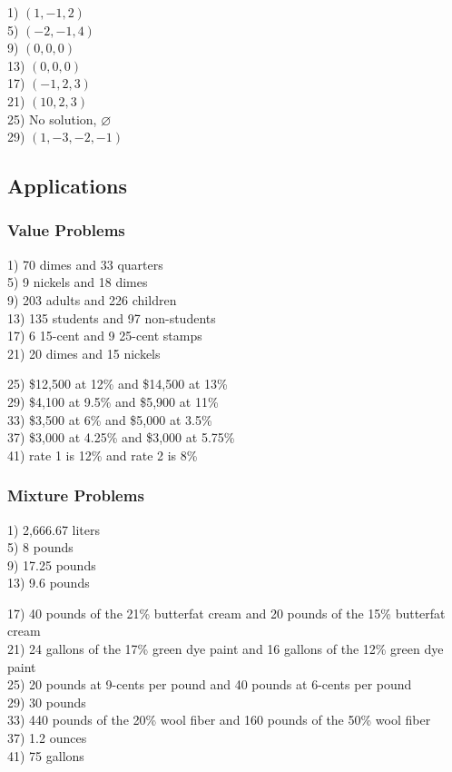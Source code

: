 \documentclass[11pt]{book}
\begin{document}
\begin{multicols}{2}
1) $(1,-1,2)$\\
5) $(-2,-1,4)$\\
9) $(0,0,0)$\\
13) $(0,0,0)$\\
17) $(-1,2,3)$\\
21) $(10,2,3)$\\
25) No solution, $\varnothing$\\
29) $(1,-3,-2,-1)$
\end{multicols}

\subsection*{Applications}
\subsubsection{Value Problems}

\begin{multicols}{2}
1) 70 dimes and 33 quarters\\
5) 9 nickels and 18 dimes\\
9) 203 adults and 226 children\\
13) 135 students and 97 non-students\\
17) 6 15-cent and 9 25-cent stamps\\
21) 20 dimes and 15 nickels
\end{multicols}
25) \$12,500 at 12\% and \$14,500 at 13\% \\
29) \$4,100 at 9.5\% and \$5,900 at 11\% \\
33) \$3,500 at 6\% and \$5,000 at 3.5\% \\
37) \$3,000 at 4.25\% and \$3,000 at 5.75\% \\
41) rate 1 is 12\% and rate 2 is 8\%

\subsubsection{Mixture Problems}

\begin{multicols}{2}
1) 2,666.67 liters\\
5) 8 pounds\\
9) 17.25 pounds\\
13) 9.6 pounds
\end{multicols}
17) 40 pounds of the 21\% butterfat cream and 20 pounds of the 15\% butterfat cream\\
21) 24 gallons of the 17\% green dye paint and 16 gallons of the 12\% green dye paint\\
25) 20 pounds at 9-cents per pound and 40 pounds at 6-cents per pound\\
29) 30 pounds\\
33) 440 pounds of the 20\% wool fiber and 160 pounds of the 50\% wool fiber\\
37) 1.2 ounces\\
41) 75 gallons
\end{document}
